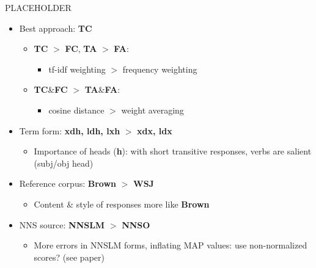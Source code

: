 \documentclass[final,t]{beamer}
\begin{document}
\begin{frame}{}
\begin{columns}[t]
\begin{column}{.64\linewidth}
\begin{columns}
\begin{column}{.49\linewidth}
\begin{block}{PLACEHOLDER}
\vspace{.6em}
\begin{multicols}{2}
\begin{itemize}
	\item{Best approach: \textbf{TC}}
	\begin{itemize}
		\item{\textbf{TC} $>$ \textbf{FC}, \textbf{TA} $>$ \textbf{FA}:} 
		\begin{itemize}
			\item{tf-idf weighting $>$ frequency weighting}
		\end{itemize}
		\item{\textbf{TC}\&\textbf{FC} $>$ \textbf{TA}\&\textbf{FA}:}
		\begin{itemize}
			\item{cosine distance $>$ weight averaging}
		\end{itemize}
	\end{itemize}
	\item{Term form: \textbf{xdh, ldh, lxh} $>$ \textbf{xdx, ldx}}
	\begin{itemize}
        \item{Importance of heads (\textbf{h}): with short transitive
            responses, verbs are salient (subj/obj head)}
	\end{itemize}
	\item{Reference corpus: \textbf{Brown} $>$ \textbf{WSJ}}
	\begin{itemize}
        \item{Content \& style of responses more like \textbf{Brown}}
	\end{itemize}
	\item{NNS source: \textbf{NNSLM} $>$ \textbf{NNSO}}
	\begin{itemize}
        \item{More errors in NNSLM forms, inflating MAP values:
            use non-normalized scores? (see paper)}
	\end{itemize}
\end{itemize}


\end{multicols}
\end{block}
\end{column}
\end{columns}
\end{column}
\end{columns}
\end{frame}
\end{document}
